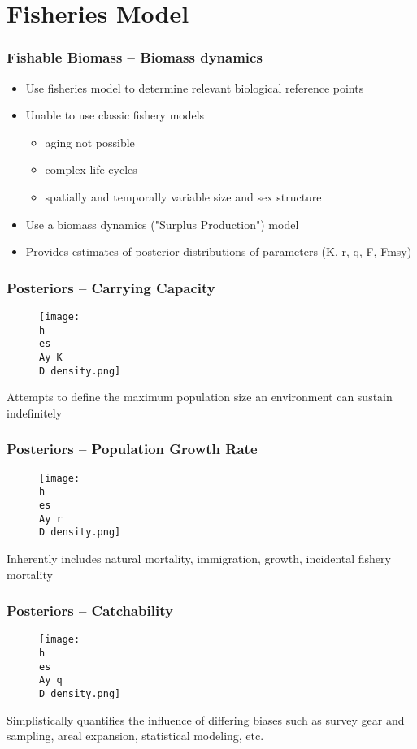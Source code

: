 \documentclass{beamer}
\numberwithin{equation}{section}		%
\numberwithin{figure}{section}	   	%
\numberwithin{table}{section}				%
\newcommand{\D}{.}  %
\newcommand{\h}{C:/} %
\newcommand{\es}{bio.data/bio.snowcrab/} %
\newcommand{\Ay}{assessments/2017/}
\begin{document}
\section{Fisheries Model}
\begin{frame}
\frametitle{Fishable Biomass -- Biomass dynamics}
	\begin{itemize}
		\item Use fisheries model to determine relevant biological reference points
		\item Unable to use classic fishery models
			\begin{itemize}
				\item aging not possible
				\item complex life cycles
				\item spatially and temporally variable size  and sex structure
			\end{itemize}
		\item Use a biomass dynamics ("Surplus Production") model
		\item Provides estimates of posterior distributions of parameters (K, r, q, F, Fmsy) 
	\end{itemize}
\end{frame}


\begin{frame}
\frametitle{Posteriors -- Carrying Capacity}
\begin{figure}
	\centering
	\texttt{[image: \\h \\es \\Ay K\\D density.png]} 
\end{figure}
Attempts to define the maximum population size an environment can sustain indefinitely
\end{frame}


\begin{frame}
\frametitle{Posteriors -- Population Growth Rate}
\begin{figure}
\centering
\texttt{[image: \\h \\es \\Ay r\\D density.png]} 
\end{figure}
Inherently includes natural mortality, immigration, growth, incidental fishery mortality 
\end{frame}


\begin{frame}
\frametitle{Posteriors -- Catchability}
\begin{figure}
\centering
\texttt{[image: \\h \\es \\Ay q\\D density.png]} 
\end{figure}
Simplistically quantifies the influence of differing biases such as survey gear and sampling,  areal expansion,  statistical modeling, etc.
\end{frame}
\end{document}
